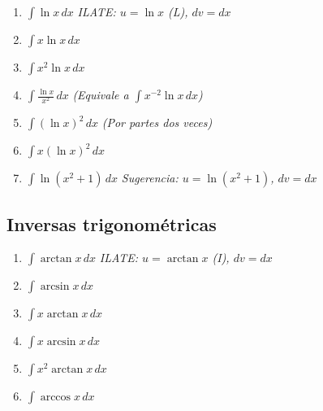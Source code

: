 \documentclass[12pt, letterpaper]{article}
\newcommand{\dx}{\,dx}
\begin{document}
\begin{enumerate}[label=\textbf{\arabic*.}, leftmargin=*, itemsep=12pt, start=61]

  \item \facil\quad
    $\displaystyle\int \ln x\dx$
    \qquad\textit{ILATE: $u = \ln x$ (L), $dv = dx$}

  \item \medio\quad
    $\displaystyle\int x\ln x\dx$

  \item \medio\quad
    $\displaystyle\int x^2\ln x\dx$

  \item \medio\quad
    $\displaystyle\int \frac{\ln x}{x^2}\dx$
    \qquad\textit{(Equivale a $\int x^{-2}\ln x\dx$)}

  \item \dificil\quad
    $\displaystyle\int (\ln x)^2\dx$
    \qquad\textit{(Por partes dos veces)}

  \item \dificil\quad
    $\displaystyle\int x(\ln x)^2\dx$

  \item \dificil\quad
    $\displaystyle\int \ln(x^2+1)\dx$
    \qquad\textit{Sugerencia: $u = \ln(x^2+1)$, $dv = dx$}

\end{enumerate}

\subsection{Inversas trigonométricas}

\begin{enumerate}[label=\textbf{\arabic*.}, leftmargin=*, itemsep=12pt, start=68]

  \item \medio\quad
    $\displaystyle\int \arctan x\dx$
    \qquad\textit{ILATE: $u = \arctan x$ (I), $dv = dx$}

  \item \medio\quad
    $\displaystyle\int \arcsin x\dx$

  \item \medio\quad
    $\displaystyle\int x\arctan x\dx$

  \item \dificil\quad
    $\displaystyle\int x\arcsin x\dx$

  \item \dificil\quad
    $\displaystyle\int x^2\arctan x\dx$

  \item \dificil\quad
    $\displaystyle\int \arccos x\dx$

\end{enumerate}
\end{document}
